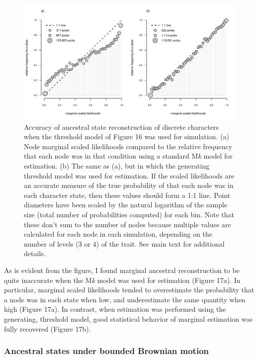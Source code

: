 \documentclass{article}
\begin{document}
\begin{figure}
\includegraphics[width=1\linewidth]{Revell.AncestralReconstruction_files/figure-latex/fig17-1} \caption{Accuracy of ancestral state reconstruction of discrete characters when the threshold model of Figure 16 was used for simulation. (a) Node marginal scaled likelihoods compared to the relative frequency that each node was in that condition using a standard M\emph{k} model for estimation. (b) The same as (a), but in which the generating threshold model was used for estimation. If the scaled likelihoods are an accurate measure of the true probability of that each node was in each character state, then these values should form a 1:1 line. Point diameters have been scaled by the natural logarithm of the sample size (total number of probabilities computed) for each bin. Note that these don't sum to the number of nodes because multiple values are calculated for each node in each simulation, depending on the number of levels (3 or 4) of the trait. See main text for additional details.}\label{fig:fig17}
\end{figure}

As is evident from the figure, I found marginal ancestral reconstruction to be quite inaccurate when the M\emph{k} model was used for estimation (Figure 17a). In particular, marginal scaled likelihoods tended to overestimate the probability that a node was in each state when low, and underestimate the same quantity when high (Figure 17a). In contrast, when estimation was performed using the generating, threshold model, good statistical behavior of marginal estimation was fully recovered (Figure 17b).

\subsubsection{Ancestral states under bounded Brownian motion}\label{ancestral-states-under-bounded-brownian-motion}
\end{document}
